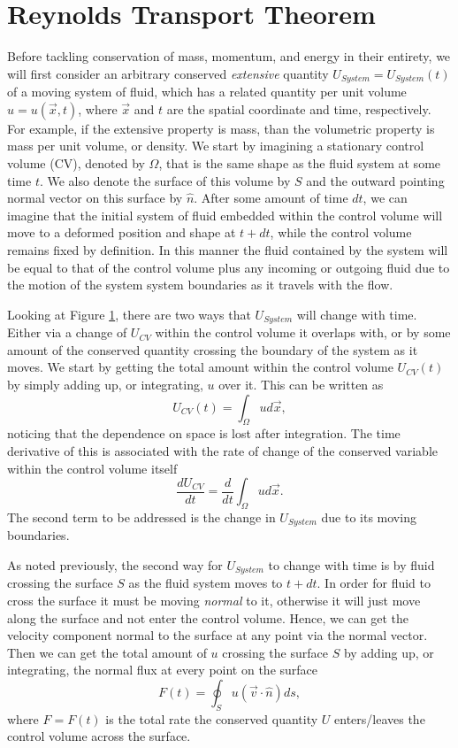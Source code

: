 \section{Reynolds Transport Theorem}
Before tackling conservation of mass, momentum, and energy in their entirety, we will first consider an arbitrary conserved {\it extensive} quantity $U_{System} = U_{System}(t)$ of a moving system of fluid, which has a related quantity per unit volume $u = u(\vec{x},t)$, where $\vec{x}$ and $t$ are the spatial coordinate and time, respectively. For example, if the extensive property is mass, than the volumetric property is mass per unit volume, or density. We start by imagining a stationary control volume (CV), denoted by $\Omega$, that is the same shape as the fluid system at some time $t$. We also denote the surface of this volume by $S$ and the outward pointing normal vector on this surface by $\hat{n}$. After some amount of time $dt$, we can imagine that the initial system of fluid embedded within the control volume will move to a deformed position and shape at $t + dt$, while the control volume remains fixed by definition. In this manner the fluid contained by the system will be equal to that of the control volume plus any incoming or outgoing fluid due to the motion of the system system boundaries as it travels with the flow.

Looking at Figure \ref{}, there are two ways that $U_{System}$ will change with time. Either via a change of $U_{CV}$ within the control volume it overlaps with, or by some amount of the conserved quantity crossing the boundary of the system as it moves. We start by getting the total amount within the control volume $U_{CV}(t)$ by simply adding up, or integrating, $u$ over it. This can be written as
\begin{equation}
	\label{eqn:totalcons}
	U_{CV}(t) = \int_\Omega u d\vec{x},
\end{equation}
noticing that the dependence on space is lost after integration. The time derivative of this is associated with the rate of change of the conserved variable within the control volume itself
\begin{equation}
	\label{eqn:totalcons}
	\frac{dU_{CV}}{dt} = \frac{d}{dt}\int_\Omega u d\vec{x}.
\end{equation}
The second term to be addressed is the change in $U_{System}$ due to its moving boundaries.

As noted previously, the second way for $U_{System}$ to change with time is by fluid crossing the surface $S$ as the fluid system moves to $t+dt$. In order for fluid to cross the surface it must be moving {\it normal} to it, otherwise it will just move along the surface and not enter the control volume. Hence, we can get the velocity component normal to the surface at any point via the normal vector. Then we can get the total amount of $u$ crossing the surface $S$ by adding up, or integrating, the normal flux at every point on the surface
\begin{equation}
	\label{eqn:totalflux}
	F(t) = \oint_S u (\vec{v} \cdot \hat{n}) ds,
\end{equation}
where $F = F(t)$ is the total rate the conserved quantity $U$ enters/leaves the control volume across the surface.

